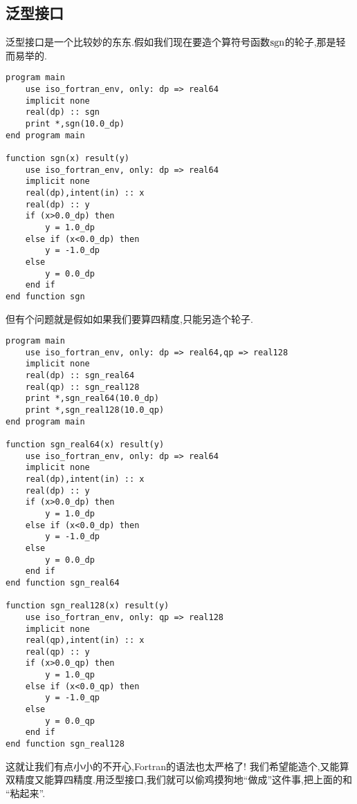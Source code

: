 \subsection{泛型接口}

泛型接口是一个比较妙的东东.假如我们现在要造个算符号函数$\operatorname{sgn}$的轮子,那是轻而易举的.
\begin{lstlisting}
program main
    use iso_fortran_env, only: dp => real64
    implicit none
    real(dp) :: sgn
    print *,sgn(10.0_dp)
end program main

function sgn(x) result(y)
    use iso_fortran_env, only: dp => real64
    implicit none
    real(dp),intent(in) :: x
    real(dp) :: y
    if (x>0.0_dp) then
        y = 1.0_dp
    else if (x<0.0_dp) then
        y = -1.0_dp
    else
        y = 0.0_dp
    end if
end function sgn
\end{lstlisting}
但有个问题就是假如如果我们要算四精度,只能另造个轮子.
\begin{lstlisting}
program main
    use iso_fortran_env, only: dp => real64,qp => real128
    implicit none
    real(dp) :: sgn_real64
    real(qp) :: sgn_real128
    print *,sgn_real64(10.0_dp)
    print *,sgn_real128(10.0_qp)
end program main

function sgn_real64(x) result(y)
    use iso_fortran_env, only: dp => real64
    implicit none
    real(dp),intent(in) :: x
    real(dp) :: y
    if (x>0.0_dp) then
        y = 1.0_dp
    else if (x<0.0_dp) then
        y = -1.0_dp
    else
        y = 0.0_dp
    end if
end function sgn_real64

function sgn_real128(x) result(y)
    use iso_fortran_env, only: qp => real128
    implicit none
    real(qp),intent(in) :: x
    real(qp) :: y
    if (x>0.0_qp) then
        y = 1.0_qp
    else if (x<0.0_qp) then
        y = -1.0_qp
    else
        y = 0.0_qp
    end if
end function sgn_real128
\end{lstlisting}
这就让我们有点小小的不开心,Fortran的语法也太严格了! 我们希望能造个,又能算双精度又能算四精度.用泛型接口,我们就可以偷鸡摸狗地``做成''这件事,把上面的和 ``粘起来''.
